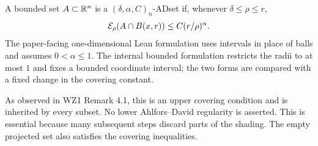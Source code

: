 \begin{definition}
\label{def:ad-set}
\leanok
A bounded set $A\subset\mathbb{R}^n$ is a $(\delta,\alpha,C)_n$-ADset if,
whenever $\delta\leq\rho\leq r$,
\[
 \mathcal{E}_\rho(A\cap B(x,r))\leq C(r/\rho)^\alpha.
\]
The paper-facing one-dimensional Lean formulation uses intervals in
place of balls and assumes $0<\alpha\leq1$. The internal bounded
formulation restricts the radii to at most $1$ and fixes a bounded
coordinate interval; the two forms are compared with a fixed change
in the covering constant.
\end{definition}

\begin{remark}
\label{rem:upper-ad}
As observed in WZ1 Remark 4.1, this is an upper covering condition and
is inherited by every subset. No lower Ahlfors--David regularity is
asserted. This is essential because many subsequent steps discard
parts of the shading. The empty projected set also satisfies the
covering inequalities.
\end{remark}
